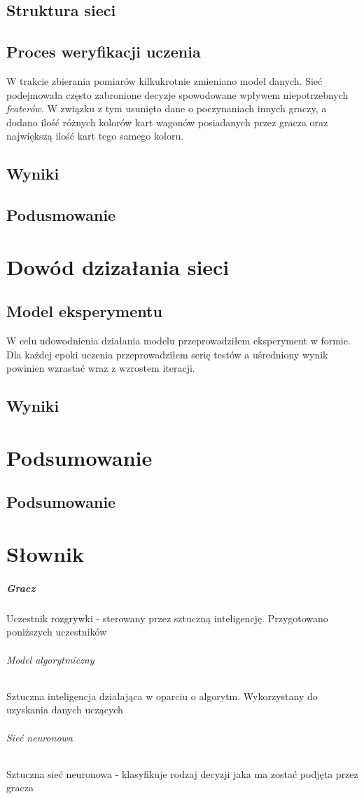 \documentclass[12pt, oneside]{report}
\begin{document}
\section{Struktura sieci}
\section{Proces weryfikacji uczenia}
W trakcie zbierania pomiarów kilkukrotnie zmieniano model danych. Sieć podejmowała często zabronione decyzje spowodowane wpływem niepotrzebnych \textit{featerów}. W związku z tym usunięto dane o poczynaniach innych graczy, a dodano ilość różnych kolorów kart wagonów posiadanych przez gracza oraz największą ilość kart tego samego koloru.
\section{Wyniki} 
\section{Podusmowanie}
\chapter{Dowód dzizałania sieci}
\section{Model eksperymentu}
W celu udowodnienia działania modelu przeprowadziłem eksperyment w formie. Dla każdej epoki uczenia przeprowadziłem serię testów a uśredniony wynik powinien wzrastać wraz z wzrostem iteracji.
\section{Wyniki}
\chapter{Podsumowanie}
\section{Podsumowanie}
\chapter{Słownik}
\paragraph{Gracz}
Uczestnik rozgrywki - sterowany przez sztuczną inteligencję. Przygotowano poniższych uczestników
\subparagraph{Model algorytmiczny} Sztuczna inteligencja działająca w oparciu o algorytm. Wykorzystany do uzyskania danych uczących
\subparagraph{Sieć neuronowa} Sztuczna sieć neuronowa - klasyfikuje rodzaj decyzji jaka ma zostać podjęta przez gracza
\end{document}

